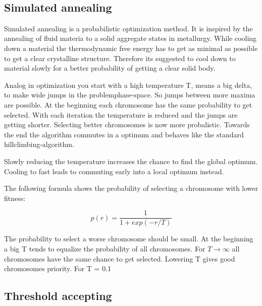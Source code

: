 \documentclass[10pt,a4paper,DIV=11]{scrreprt}
\begin{document}
 \\


\subsection{Simulated annealing}
Simulated annealing is a probabilistic optimization method.
It is inspired by the annealing of fluid materia to a solid aggregate states in metallurgy. While cooling down a material the thermodynamic free energy has to get as minimal as possible to get a clear crystalline structure. Therefore its suggested to cool down to material slowly for a better probability of getting a clear solid body.

Analog in optimization you start with a high temperature T, means a big delta, to make wide jumps in the problemphase-space. So jumps between more maxima are possible. At the beginning each chromosome has the same probability to get selected. With each iteration the temperature is reduced and the jumps are getting shorter. Selecting better chromosomes is now more probalistic.
Towards the end the algorithm commutes in a optimum and behaves like the standard hillclimbing-algorithm.

Slowly reducing the temperature increases the chance to find the global optimum. Cooling to fast leads to commuting early into a local optimum instead.

The following formula shows the probability of selecting a chromosome with lower fitness:

\begin{equation}
p(r) = \frac{1}{1+exp(-r/T)}
\end{equation} 

The probability to select a worse chromosome should be small.
At the beginning a big T tends to equalize the probability of all chromosomes. For $T \to \infty$ all chromosomes have the same chance to get selected. Lowering T gives good chromosomes priority. For T = 0.1

\subsection{Threshold accepting}
\end{document}
